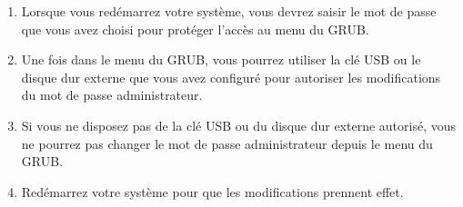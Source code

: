 \documentclass[12pt,a4paper]{article}
\begin{document}
\begin{flushleft}
\begin{enumerate}
                \item Lorsque vous redémarrez votre système, vous devrez saisir le mot de passe que vous avez choisi pour protéger l'accès au menu du GRUB. 
                \item Une fois dans le menu du GRUB, vous pourrez utiliser la clé USB ou le disque dur externe que vous avez configuré pour autoriser les modifications du mot de passe administrateur. 
                \item Si vous ne disposez pas de la clé USB ou du disque dur externe autorisé, vous ne pourrez pas changer le mot de passe administrateur depuis le menu du GRUB.
                \item Redémarrez votre système pour que les modifications prennent effet.
            \end{enumerate}
        \end{flushleft}
        
        \newpage
\end{document}
